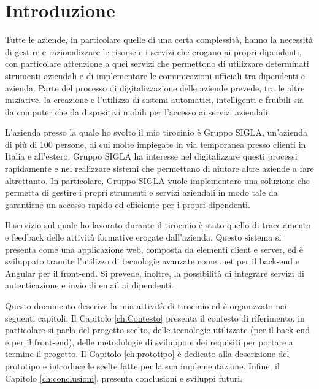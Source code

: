 \chapter{Introduzione}\label{ch:introduzione}
Tutte le aziende, in particolare quelle di una certa complessità, hanno la necessità di gestire e razionalizzare le risorse e i servizi che erogano ai propri dipendenti, con particolare attenzione a quei servizi che permettono di utilizzare determinati strumenti aziendali e di implementare le comunicazioni ufficiali tra dipendenti e azienda. 
Parte del processo di digitalizzazione delle aziende prevede, tra le altre iniziative, la creazione e l'utilizzo di sistemi automatici, intelligenti e fruibili sia da computer che da dispositivi mobili per l'accesso ai servizi aziendali.

L'azienda presso la quale ho svolto il mio tirocinio è Gruppo SIGLA, un'azienda di più di 100 persone, di cui molte impiegate in via temporanea presso clienti in Italia e all'estero. Gruppo SIGLA ha interesse nel digitalizzare questi processi rapidamente e nel realizzare sistemi che permettano di aiutare altre aziende a fare altrettanto.
In particolare, Gruppo SIGLA vuole implementare una soluzione che permetta di gestire i propri strumenti e servizi aziendali in modo tale da garantirne un accesso rapido ed efficiente per i propri dipendenti.

Il servizio sul quale ho lavorato durante il tirocinio è stato quello di tracciamento e feedback delle attività formative erogate dall'azienda.
Questo sistema si presenta come una applicazione web, composta da elementi client e server, ed è sviluppato tramite l'utilizzo di tecnologie avanzate come \gls{.net} per il back-end e Angular per il front-end. Si prevede, inoltre, la possibilità di integrare servizi di autenticazione e invio di email ai dipendenti.


Questo documento descrive la mia attività di tirocinio ed è organizzato nei seguenti capitoli.
%
Il Capitolo \ref{ch:Contesto} presenta il contesto di riferimento, in particolare si parla del progetto scelto, delle tecnologie utilizzate (per il back-end e per il front-end), delle metodologie di sviluppo e dei requisiti per portare a termine il progetto.
%
Il Capitolo \ref{ch:prototipo} è dedicato alla descrizione del prototipo e introduce le scelte fatte per la sua implementazione. %
%
Infine, il Capitolo \ref{ch:conclusioni}, presenta conclusioni e sviluppi futuri.
